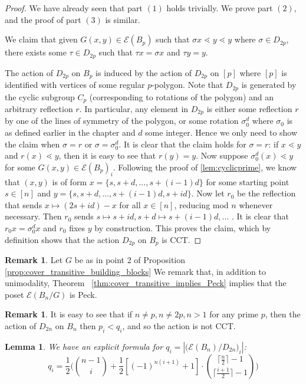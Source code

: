 \documentclass[10 pt]{amsart}
\theoremstyle{plain}
\newtheorem{lem}[thm]{Lemma}
\theoremstyle{definition}
\newtheorem{rem}[thm]{Remark}
\theoremstyle{remark}
\numberwithin{equation}{section}
\begin{document}
\begin{proof}
We have already seen that part $(1)$ holds trivially. We prove part $(2)$, and the proof of part $(3)$ is similar. 

We claim that given $G(x, y) \in \mathcal E (B_p)$ such that $\sigma x \lessdot y \lessdot y$ where $\sigma \in D_{2p}$, there exists some $\tau \in D_{2p}$ such that $\tau x = \sigma x$ and $\tau y = y$. 

The action of $D_{2p}$ on $B_p$ is induced by the action of $D_{2p}$ on $[p]$ where $[p]$ is identified with vertices of some regular $p$-polygon. Note that $D_{2p}$ is generated by the cyclic subgroup $C_p$ (corresponding to rotations of the polygon) and an arbitrary reflection $r$. In particular, any element in $D_{2p}$ is either some reflection $r$ by one of the lines of symmetry of the polygon, or some rotation $\sigma_0^{d} $ where $\sigma_0$ is as defined earlier in the chapter and $d$ some integer. Hence we only need to show the claim when $\sigma = r$ or $\sigma = \sigma_0^d$. It is clear that the claim holds for $\sigma = r$: if $x \lessdot y$ and $r (x) \lessdot y$, then it is easy to see that $r (y) = y$. Now suppose $\sigma_0^d (x) \lessdot y$ for some $G(x,y) \in \mathcal E(B_p)_i$.  Following the proof of \ref{lem:cyclicprime}, we know that $(x, y)$ is of form $x = \{s, s+d, ..., s+(i-1)d\}$ for some starting point $s \in [n]$ and $y = \{s, s+d, ..., s+(i-1)d, s + id\}$. Now let $r_0$ be the reflection that sends $x \mapsto (2s+ id)-x$ for all $x \in [n]$, reducing mod $n$ whenever necessary. Then $r_0$ sends $s \mapsto s+id, s+d \mapsto s+ (i-1)d, ...$ . It is clear that $r_0 x = \sigma_0^d x$ and $r_0$ fixes $y$ by construction. This proves the claim, which by definition shows that  the action $D_{2p}$ on $B_p$ is CCT. 
\end{proof}

\begin{rem}
Let $G$ be as in point 2 of Proposition \ref{prop:cover_transitive_building_blocks} We remark that, in addition to unimodality, Theorem ~\ref{thm:cover_transitive_implies_Peck} implies that the poset $\mathcal E(B_n/G)$ is Peck.
\end{rem}

\begin{rem}
It is easy to see that if $n \neq p,n \neq 2p, n >1$ for any prime $p$, then the action of $D_{2n}$ on $B_n$ then $p_i<q_i$, and so the action is not CCT.
\end{rem}

\begin{lem}{\label{dihedral002}}
 We have an explicit formula for $q_i = |\big(\mathcal E (B_n)/D_{2n} \big)_i|$:
 $$q_i = \frac{1}{2} \Big( {n-1 \choose i } + \frac{1}{2} [(-1)^{n(i+1)}+1] \cdot { \lceil \frac n 2\rceil -1  \choose \lceil \frac{i+1} 2 \rceil - 1}  \Big)$$
\end{lem}
\end{document}

